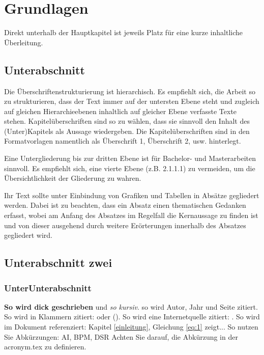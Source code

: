\section{Grundlagen} \label{grundlagen}

Direkt unterhalb der Hauptkapitel ist jeweils Platz für eine kurze inhaltliche Überleitung.

\subsection{Unterabschnitt}

Die Überschriftenstrukturierung ist hierarchisch. Es empfiehlt sich, die Arbeit so zu strukturieren, dass der Text immer auf der untersten Ebene steht und zugleich auf gleichen Hierarchieebenen inhaltlich auf gleicher Ebene verfasste Texte stehen. Kapitelüberschriften sind so zu wählen, dass sie sinnvoll den Inhalt des (Unter)Kapitels als Aussage wiedergeben. Die Kapitelüberschriften sind in den Formatvorlagen namentlich als Überschrift 1, Überschrift 2, usw. hinterlegt.

Eine Untergliederung bis zur dritten Ebene ist für Bachelor- und Masterarbeiten sinnvoll. Es empfiehlt sich, eine vierte Ebene (z.B. 2.1.1.1) zu vermeiden, um die Übersichtlichkeit der Gliederung zu wahren.

Ihr Text sollte unter Einbindung von Grafiken und Tabellen in Absätze gegliedert werden. Dabei ist zu beachten, dass ein Absatz einen thematischen Gedanken erfasst, wobei am Anfang des Absatzes im Regelfall die Kernaussage zu finden ist und von dieser ausgehend durch weitere Erörterungen innerhalb des Absatzes gegliedert wird.

\subsection{Unterabschnitt zwei}

\subsubsection{UnterUnterabschnitt}

\textbf{So wird dick geschrieben} und \textit{so kursiv}.  so wird Autor, Jahr und Seite zitiert. So wird in Klammern zitiert:  oder (\textcites[685]{janiesch2021machine}[289]{herm2021symbolic}). So wird eine Internetquelle zitiert: . So wird im Dokument referenziert: Kapitel \ref{einleitung}, Gleichung \ref{eq:1} zeigt...
So nutzen Sie Abkürzungen: \ac{AI}, \ac{BPM}, \ac{DSR} Achten Sie darauf, die Abkürzung in der acronym.tex zu definieren.

